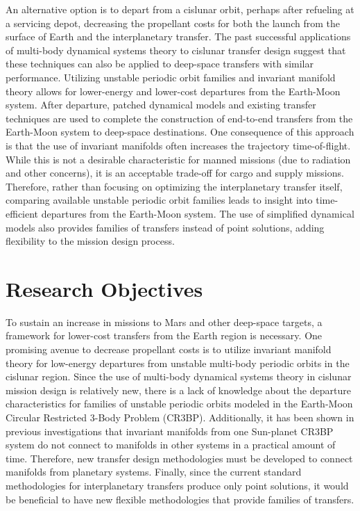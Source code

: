An alternative option is to depart from a cislunar orbit, perhaps after refueling at a
servicing depot, decreasing the propellant costs for both the launch from the surface of Earth and the
interplanetary transfer. The past successful applications of multi-body dynamical systems theory to
cislunar transfer design suggest that these techniques can also be applied to deep-space transfers with
similar performance. Utilizing unstable periodic orbit families and invariant manifold theory
allows for lower-energy and lower-cost departures from the Earth-Moon system. After departure, patched
dynamical models and existing transfer techniques are used to complete the construction of
end-to-end transfers from the Earth-Moon system to deep-space destinations. One consequence of this approach is that the use
of invariant manifolds often increases the trajectory time-of-flight. While this is not a desirable
characteristic for manned missions (due to radiation and other concerns), it is an acceptable
trade-off for cargo and supply missions. Therefore, rather than focusing on optimizing the
interplanetary transfer itself, comparing available unstable periodic orbit families
leads to insight into time-efficient departures from the Earth-Moon system. The use of simplified
dynamical models also provides families of transfers instead of point solutions, adding flexibility
to the mission design process. 

\section{Research Objectives}
To sustain an increase in missions to Mars and other deep-space targets, a framework for lower-cost
transfers from the Earth region is necessary. One promising avenue to decrease propellant costs is
to utilize invariant manifold theory for low-energy departures from unstable multi-body
periodic orbits in the cislunar region. Since the use of multi-body dynamical systems theory in cislunar mission design is
relatively new, there is a lack of knowledge about the departure characteristics for families of
unstable periodic orbits modeled in the Earth-Moon Circular Restricted 3-Body Problem (CR3BP). Additionally,
it has been shown in previous investigations that invariant manifolds from one Sun-planet CR3BP system
do not connect to manifolds in other systems in a practical amount of time\cite{Koon:2000}.
Therefore, new transfer design methodologies must be developed to connect manifolds from planetary systems. Finally,
since the current standard methodologies for interplanetary transfers produce only point solutions,
it would be beneficial to have new flexible methodologies that provide families of transfers.

